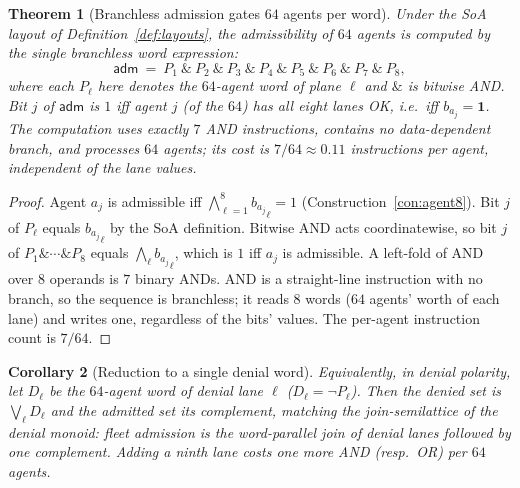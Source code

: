 \documentclass[11pt,oneside]{book}
\theoremstyle{definition}
\theoremstyle{plain}
\newtheorem{theorem}{Theorem}[chapter]
\newtheorem{corollary}[theorem]{Corollary}
\theoremstyle{remark}
\newcommand{\abyte}[1]{{b_{#1}}}                 %
\begin{document}
\begin{theorem}[Branchless admission gates $64$ agents per word]\label{thm:branchless}
Under the SoA layout of Definition~\ref{def:layouts}, the admissibility of $64$ agents is computed by the single branchless word expression:
\[
\mathsf{adm}\ =\ P_1\ \&\ P_2\ \&\ P_3\ \&\ P_4\ \&\ P_5\ \&\ P_6\ \&\ P_7\ \&\ P_8,
\]
where each $P_\ell$ here denotes the $64$-agent word of plane $\ell$ and $\&$ is bitwise AND. %
Bit $j$ of $\mathsf{adm}$ is $1$ iff agent $j$ (of the $64$) has all eight lanes OK, i.e.\ iff $\abyte{a_j}=\mathbf 1$. %
The computation uses exactly $7$ AND instructions, contains no data-dependent branch, and processes $64$ agents; its cost is $7/64\approx 0.11$ instructions per agent, independent of the lane \emph{values}. %
\end{theorem}

\begin{proof}
Agent $a_j$ is admissible iff $\bigwedge_{\ell=1}^{8}\abyte{a_j}_\ell=1$ (Construction~\ref{con:agent8}). %
Bit $j$ of $P_\ell$ equals $\abyte{a_j}_\ell$ by the SoA definition. %
Bitwise AND acts coordinatewise, so bit $j$ of $P_1\&\cdots\&P_8$ equals $\bigwedge_\ell \abyte{a_j}_\ell$, which is $1$ iff $a_j$ is admissible. %
A left-fold of AND over $8$ operands is $7$ binary ANDs. %
AND is a straight-line instruction with no branch, so the sequence is branchless; it reads $8$ words ($64$ agents' worth of each lane) and writes one, regardless of the bits' values. %
The per-agent instruction count is $7/64$. %
\end{proof}

\begin{corollary}[Reduction to a single denial word]\label{cor:onedenial}
Equivalently, in denial polarity, let $D_\ell$ be the $64$-agent word of denial lane $\ell$ ($D_\ell=\lnot P_\ell$). %
Then the \emph{denied} set is $\bigvee_\ell D_\ell$ and the admitted set its complement, matching the join-semilattice of the denial monoid: fleet admission is the word-parallel join of denial lanes followed by one complement. %
Adding a ninth lane costs one more AND (resp.\ OR) per $64$ agents. %
\end{corollary}
\end{document}
